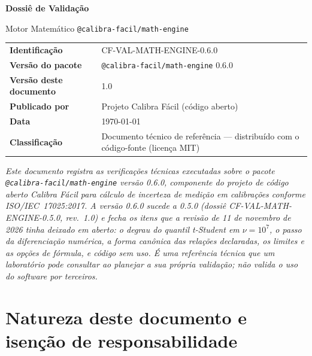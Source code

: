 \documentclass[11pt,a4paper]{article}
\makeatletter
\newcommand{\docTitle}{Dossiê de Validação}
\newcommand{\docSubject}{Motor Matemático \texttt{@calibra-facil/math-engine}}
\newcommand{\docVersion}{0.6.0}
\newcommand{\docRevision}{1.0}
\newcommand{\docId}{CF-VAL-MATH-ENGINE-0.6.0}
\newcommand{\docDate}{\today}
\newcommand{\organizationName}{Projeto Calibra Fácil}
\newcommand{\previousVersion}{0.5.0}
\newcommand{\reviewDate}{11 de novembro de 2026}
\makeatother
\begin{document}
\begin{titlepage}
  \begin{center}
    \vspace*{1.5cm}
    {\Huge\bfseries \docTitle\par}
    \vspace{0.4cm}
    {\Large \docSubject\par}
    \vspace{2.5cm}
    \begin{tabularx}{0.85\textwidth}{l X}
      \toprule
      \textbf{Identificação} & \docId \\
      \textbf{Versão do pacote} & \texttt{@calibra-facil/math-engine} \docVersion \\
      \textbf{Versão deste documento} & \docRevision{} \\
      \textbf{Publicado por} & \organizationName{} (código aberto) \\
      \textbf{Data} & \docDate \\
      \textbf{Classificação} & Documento técnico de referência --- distribuído com o código-fonte (licença MIT) \\
      \bottomrule
    \end{tabularx}
    \vfill
    \begin{minipage}{0.85\textwidth}
      \small\itshape
      Este documento registra as verificações técnicas executadas sobre o pacote \texttt{@calibra-facil/math-engine} versão \docVersion{}, componente do projeto de código aberto Calibra Fácil para cálculo de incerteza de medição em calibrações conforme \mbox{ISO/IEC 17025:2017}. A versão \docVersion{} sucede a \previousVersion{} (dossiê CF-VAL-MATH-ENGINE-0.5.0, rev.\ 1.0) e fecha os itens que a revisão de \reviewDate{} tinha deixado em aberto: o degrau do quantil t-Student em \(\nu = 10^7\), o passo da diferenciação numérica, a forma canônica das relações declaradas, os limites e as opções de fórmula, e código sem uso. É uma referência técnica que um laboratório pode consultar ao planejar a sua própria validação; não valida o uso do software por terceiros.
    \end{minipage}
  \end{center}
\end{titlepage}

\section*{Natureza deste documento e isenção de responsabilidade}
\end{document}
